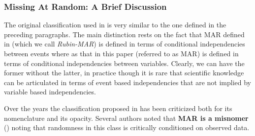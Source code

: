 \documentclass[12pt]{article}
\newcommand{\compos}{\mbox{$\bot\!\!\!\bot$}}
\begin{document}
\subsubsection{Missing At Random: A Brief Discussion} The original classification used in \cite{Rubin_missing} is very similar to the one defined in the preceding paragraphs. The main distinction rests on the fact that MAR defined in \cite{Rubin_missing} (which we call \textit{Rubin-MAR}) is defined in terms of conditional independencies between events where as that in this paper (referred to as MAR) is defined in terms of conditional independencies between variables. Clearly, we can have the former without the latter, in practice though it is rare that scientific knowledge can be articulated in terms of event based independencies that are not implied by variable based independencies.  %

Over the years the classification proposed in \cite{Rubin_missing}
has been criticized both for its nomenclature and its opacity.
Several authors noted that \textbf{MAR is
a misnomer} (\cite{scheffer2002dealing,  peters2002primer,
	meyers2006applied, graham2009missing}) noting that randomness in this class is critically conditioned on observed data.  %
\end{document}
